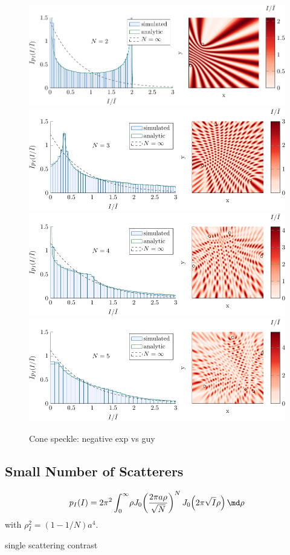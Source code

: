\begin{figure}
\centering
\includegraphics[keepaspectratio]{figures/speckle_lowscatthist/spk_hist_2.pdf}
\includegraphics[keepaspectratio]{figures/speckle_lowscatthist/spk_hist_3.pdf}
\includegraphics[keepaspectratio]{figures/speckle_lowscatthist/spk_hist_4.pdf}
\includegraphics[keepaspectratio]{figures/speckle_lowscatthist/spk_hist_5.pdf}
\caption{Cone speckle: negative exp vs guy}
\end{figure}

\subsection{Small Number of Scatterers}
\begin{equation}
p_I(I) = 2\pi^2 \int_0^\infty\! \rho J_0\!\left(\frac{2\pi a
\rho}{\sqrt{N}}\right)^N J_0\!\left(2\pi\sqrt{I}\rho\right)\md\rho
\end{equation}
with $\rho_I^2=(1-1/N)a^4$.

single scattering
contrast
